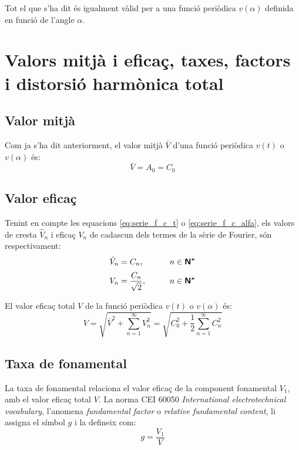 Tot el que s'ha dit és igualment vàlid per a una funció periòdica
$v(\alpha)$  definida en funció de l'angle $\alpha$.


\section{Valors mitjà i eficaç, taxes, factors i distorsió harmònica total}\label{sec:four_val_mitja_ef}

\subsection{Valor mitjà}\label{sec:four_val_av}

Com ja s'ha dit anteriorment, el valor mitjà $\bar{V}$ d'una
funció periòdica $v(t)$ o $v(\alpha)$ és:
\begin{equation}
    \bar{V} = A_0 = C_0\label{eq:fourier_ave}
\end{equation}

\subsection{Valor eficaç}\label{sec:four_val_ef}

Tenint en compte les equacions  \eqref{eq:serie_f_c_t} o
\eqref{eq:serie_f_c_alfa}, els valors de cresta $\hat{V}_n$ i eficaç
$V_n$ de cadascun dels termes de la sèrie de Fourier, són respectivament:
\begin{alignat}{2}
    \hat{V}_n &= C_n, &\qquad n \in {\ensuremath{\boldsymbol{\mathsf{N^*}}}}\\[0.5ex]
    V_n &= \frac{C_n}{\sqrt{2}}, &\qquad n \in {\ensuremath{\boldsymbol{\mathsf{N^*}}}}\label{eq:fourier_efi}
\end{alignat}

El valor eficaç total $V$ de  la funció periòdica $v(t)$ o
$v(\alpha)$ és:
\begin{equation}
    V = \sqrt{\bar{V}^2 + \sum_{n=1}^{\infty}V^2_n} =
     \sqrt{C^2_0 + \frac{1}{2} \sum_{n=1}^{\infty}C^2_n}
     \label{eq:val_ef_fourier}
\end{equation}

\subsection{Taxa de fonamental}
La taxa  de fonamental relaciona el valor eficaç de la component fonamental $V_1$, amb el valor eficaç
total $V$. La norma CEI 60050 \textit{International electrotechnical vocabulary}, l'anomena \textit{fundamental factor} o \textit{relative fundamental content}, li assigna el símbol $g$ i la defineix com:
\begin{equation}
    g = \frac{V_1}{V}
\end{equation}

